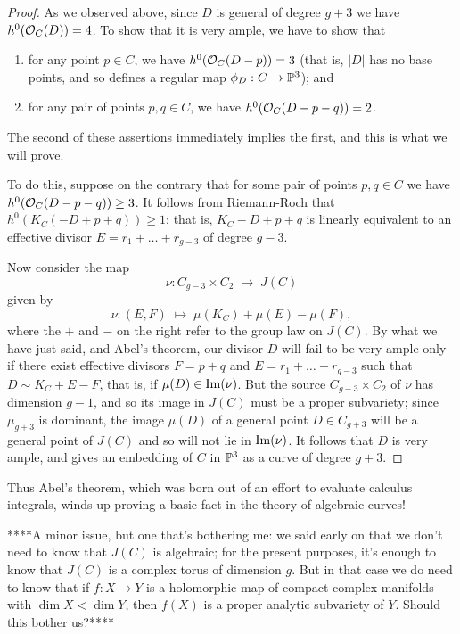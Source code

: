 \begin{proof}
As we observed above, since $D$ is general of degree $g+3$ we have $h^0(\cO_C(D)) = 4$. To show that it is very ample, we have to show that
\begin{enumerate}
\item for any point $p \in C$, we have $h^0(\cO_C(D-p)) = 3$ (that is, $|D|$ has no base points, and so defines a regular map $\phi_D : C \to \PP^3$); and
\item for any pair of points $p, q \in C$, we have $h^0(\cO_C(D-p-q)) = 2$.
\end{enumerate}
The second of these assertions immediately implies the first, and this is what we will prove.

To do this, suppose on the contrary that for some pair of points $p, q \in C$ we have $h^0(\cO_C(D-p-q)) \geq 3$. It follows from Riemann-Roch that $h^0(K_C(-D + p + q)) \geq 1$; that is, $K_C -D + p + q$ is linearly equivalent to an effective divisor $E = r_1 + \dots + r_{g-3}$ of degree $g-3$.

Now consider the map
$$
\nu : C_{g-3} \times C_2 \; \to \; J(C)
$$
given by
$$
\nu : (E,F) \; \mapsto \; \mu(K_C) + \mu(E) - \mu(F),
$$
where the $+$ and $-$ on the right refer to the group law on $J(C)$. By what we have just said, and Abel's theorem, our divisor $D$ will fail to be very ample only if there exist effective divisors $F = p+q$ and $E = r_1+\dots+r_{g-3}$ such that $D \sim K_C +E-F$, that is, if
$\mu(D) \in {\rm Im}(\nu)$. But the source $C_{g-3} \times C_2$ of $\nu$ has dimension $g-1$, and so its image in $J(C)$ must be a proper subvariety; since $\mu_{g+3}$ is dominant, the image $\mu(D)$ of a general point $D \in C_{g+3}$ will be a general point of $J(C)$ and so will not lie in ${\rm Im}(\nu)$. It follows that $D$ is very ample, and gives an embedding of $C$ in $\PP^3$ as a curve of degree $g+3$.
\end{proof}

Thus Abel's theorem, which was born out of an effort to evaluate calculus integrals, winds up proving a basic fact in the theory of algebraic curves!


****A minor issue, but one that's bothering me: we said early on that we don't need to know that $J(C)$ is algebraic; for the present purposes, it's enough to know that $J(C)$ is a  complex torus of dimension $g$. But in that case we do need to know that if $f : X \to Y$ is a holomorphic map of compact complex manifolds with $\dim X < \dim Y$, then $f(X)$ is a proper analytic subvariety of $Y$. Should this bother us?****


